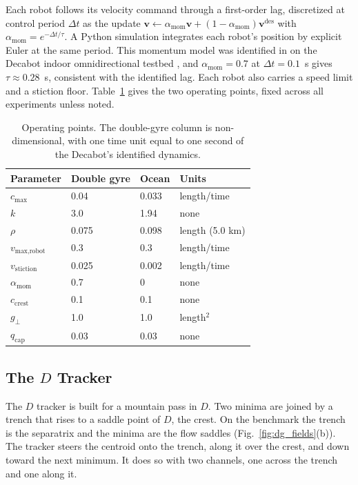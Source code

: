 \documentclass[lettersize,journal]{IEEEtran}
\begin{document}
Each robot follows its velocity command through a first-order lag,
discretized at control period $\Delta t$ as the update
$\mathbf{v} \leftarrow \alpha_{\text{mom}}\mathbf{v} + (1 -
\alpha_{\text{mom}})\mathbf{v}^{\text{des}}$ with
$\alpha_{\text{mom}} = e^{-\Delta t/\tau}$. A Python simulation integrates
each robot's position by explicit Euler at the same period. This momentum model was
identified in \cite{10} on the Decabot indoor omnidirectional testbed
\cite{31,32}, and $\alpha_{\text{mom}} = 0.7$ at $\Delta t = 0.1$~s gives
$\tau \approx 0.28$~s, consistent with the identified lag. Each robot also
carries a speed limit and a stiction floor. Table~\ref{tab:params} gives
the two operating points, fixed across all experiments unless noted.

\begin{table}[!t]
\caption{Operating points. The double-gyre column is non-dimensional,
with one time unit equal to one second of the Decabot's identified
dynamics.}
\label{tab:params}
\centering
\begin{tabular}{llll}
\hline
Parameter & Double gyre & Ocean & Units \\
\hline
$c_{\max}$              & 0.04  & 0.033  & length/time \\
$k$                     & 3.0   & 1.94   & none \\
$\rho$                  & 0.075 & 0.098  & length (5.0 km) \\
$v_{\text{max,robot}}$  & 0.3   & 0.3    & length/time \\
$v_{\text{stiction}}$   & 0.025 & 0.002  & length/time \\
$\alpha_{\text{mom}}$   & 0.7   & 0      & none \\
$c_{\mathrm{crest}}$    & 0.1   & 0.1    & none \\
$g_\perp$              & 1.0   & 1.0    & length$^2$ \\
$q_{\mathrm{cap}}$      & 0.03  & 0.03   & none \\
\hline
\end{tabular}
\end{table}

\subsection{The $D$ Tracker}
\label{sec:sep_controller}

The $D$ tracker is built for a mountain pass in $D$. Two minima are
joined by a trench that rises to a saddle point of $D$, the crest. On the
benchmark the trench is the separatrix and the minima are the flow saddles
(Fig.~\ref{fig:dg_fields}(b)). The tracker steers the centroid onto the
trench, along it over the crest, and down toward the next minimum. It
does so with two channels, one across the trench and one along it.
\end{document}

